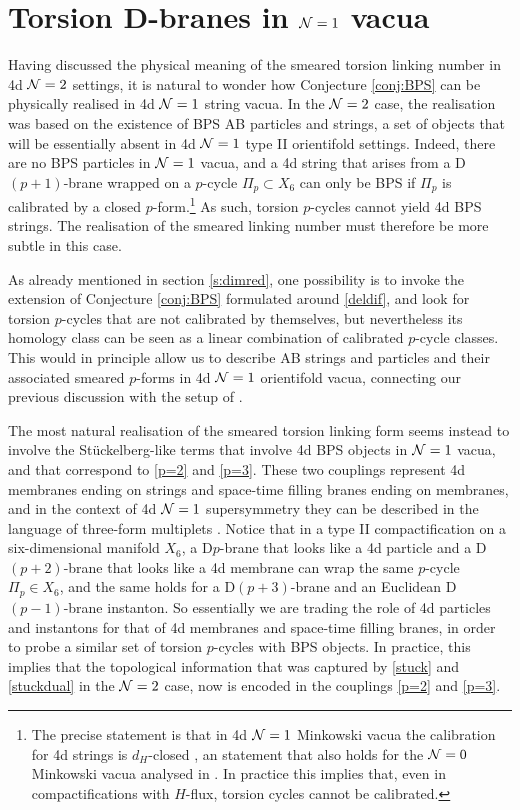 \documentclass[11pt]{article}
\def\CN {{\cal N}}
\begin{document}

\section{Torsion D-branes in $\CN=1$ vacua}
\label{s:N=1}

Having discussed the physical meaning of the smeared torsion linking number in 4d $\CN=2$ settings, it is natural to wonder how Conjecture \ref{conj:BPS} can be physically realised in 4d $\CN=1$ string vacua. In the $\CN=2$ case, the realisation was based on the existence of BPS AB particles and strings, a set of objects that will be essentially absent in 4d $\CN=1$ type II orientifold settings. Indeed, there are no BPS particles in $\CN=1$ vacua, and a 4d string that arises from a D$(p+1)$-brane wrapped on a $p$-cycle $\Pi_p \subset X_6$ can only be BPS if $\Pi_p$ is calibrated by a closed $p$-form.\footnote{The precise statement is that in 4d $\CN=1$ Minkowski vacua the calibration for 4d strings is $d_H$-closed  \cite{Martucci:2005ht,Koerber:2005qi,Koerber:2010bx}, an statement that also holds for the $\CN=0$ Minkowski vacua analysed in \cite{Lust:2008zd}. In practice this implies that, even in compactifications with $H$-flux,  torsion cycles cannot be calibrated.} As such, torsion $p$-cycles cannot yield 4d BPS strings. The realisation of the smeared linking number must therefore be more subtle in this case. 

As already mentioned in section \ref{s:dimred}, one possibility is to invoke the extension of Conjecture \ref{conj:BPS} formulated around \eqref{deldif}, and look for torsion $p$-cycles that are not calibrated by themselves, but nevertheless its homology class can be seen as a linear combination of calibrated $p$-cycle classes. This would in principle allow us to describe AB strings and particles and their associated smeared $p$-forms in 4d $\CN=1$ orientifold vacua, connecting our previous discussion with the setup of \cite{Camara:2011jg}.%

The most natural realisation of the smeared torsion linking form seems instead to involve the St\"uckelberg-like terms that involve 4d BPS objects in $\CN=1$ vacua, and that correspond to \eqref{p=2} and \eqref{p=3}. These two couplings represent 4d membranes ending on strings and space-time filling branes ending on membranes, and in the context of 4d $\CN=1$ supersymmetry they can be described in the language of three-form multiplets  \cite{Lanza:2019xxg}. Notice that in a type II compactification on a six-dimensional manifold $X_6$, a D$p$-brane that looks like a 4d particle and a D$(p+2)$-brane that looks like a 4d membrane can wrap the same $p$-cycle $\Pi_p \in X_6$, and the same holds for a D$(p+3)$-brane and an Euclidean  D$(p-1)$-brane instanton. So essentially we are trading the role of 4d particles and instantons for that of 4d membranes and space-time filling branes, in order to probe a similar set of torsion $p$-cycles with BPS objects. In practice, this implies that the topological information that was captured by \eqref{stuck} and \eqref{stuckdual} in the $\CN=2$ case, now is encoded in the couplings \eqref{p=2} and \eqref{p=3}.
\end{document}
